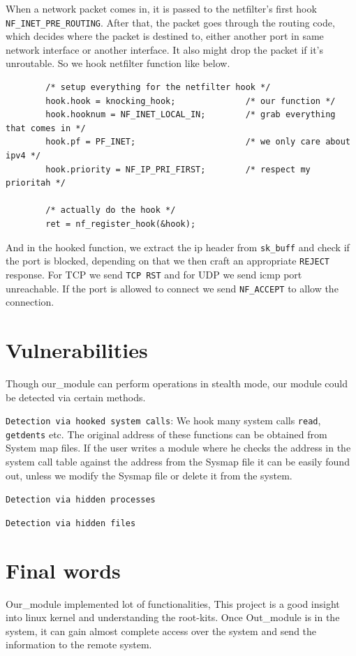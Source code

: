 \documentclass[10pt, letterpaper]{scrartcl}
\begin{document}
When a network packet comes in, it is passed to the netfilter’s first hook \texttt{NF\_INET\_PRE\_ROUTING}. After that, the packet goes through the routing code, which decides where the packet is destined to, either another port in same network interface or another interface. It also might drop the packet if it’s unroutable. So we hook netfilter function like below. 

\begin{verbatim}
        /* setup everything for the netfilter hook */
        hook.hook = knocking_hook;              /* our function */
        hook.hooknum = NF_INET_LOCAL_IN;        /* grab everything that comes in */
        hook.pf = PF_INET;                      /* we only care about ipv4 */
        hook.priority = NF_IP_PRI_FIRST;        /* respect my prioritah */

        /* actually do the hook */
        ret = nf_register_hook(&hook);
\end{verbatim} 

And in the hooked function, we extract the ip header from \texttt{sk\_buff} and check if the port is blocked, depending on that we then craft an appropriate \texttt{REJECT} response. For TCP we send \texttt{TCP RST} and for UDP we send icmp port unreachable. If the port is allowed to connect we send \texttt{NF\_ACCEPT} to allow the connection.

\section{Vulnerabilities}
Though our\_module can perform operations in stealth mode, our module could be detected via certain methods. 

\texttt{Detection via hooked system calls}: We hook many system calls \texttt{read}, \texttt{getdents} etc. 
The original address of these functions can be obtained from System map files. 
If the user writes a module where he checks the address in the system call table against the address from the Sysmap file it can be easily found out, unless we modify the Sysmap file or delete it from the system. 

\texttt{Detection via hidden processes}

\texttt{Detection via hidden files}

\section{Final words}
Our\_module implemented lot of functionalities, This project is a good insight into linux kernel and understanding the root-kits.
Once Out\_module is in the system, it can gain almost complete access over the system and send the information to the remote system. 
\end{document}
